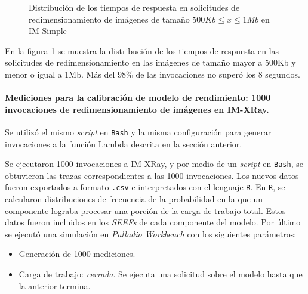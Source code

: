\begin{figure}
\hspace{-1.0cm}
\caption{Distribución de los tiempos de respuesta en solicitudes de redimensionamiento de imágenes de tamaño $500Kb \leq x \leq 1Mb$ en IM-Simple}
\label{fig:distribucion-solicitudes-imagenes-hasta-1mb}
\end{figure}


En la figura \ref{fig:distribucion-solicitudes-imagenes-hasta-1mb} se muestra la distribución de los tiempos de respuesta en las solicitudes de redimensionamiento en las imágenes de tamaño mayor a 500Kb y menor o igual a 1Mb. Más del 98\% de las invocaciones no superó los 8 segundos.

\paragraph{Mediciones para la calibración de modelo de rendimiento: 1000 invocaciones de redimensionamiento de imágenes en IM-XRay.} Se utilizó el mismo \emph{script} en \texttt{Bash} y la misma configuración para generar invocaciones a la función Lambda descrita en la sección anterior.

Se ejecutaron 1000 invocaciones a IM-XRay, y por medio de un \emph{script} en \texttt{Bash}, se obtuvieron las trazas correspondientes a las 1000 invocaciones. Los nuevos datos fueron exportados a formato \texttt{.csv} e interpretados con el lenguaje \texttt{R}. En \texttt{R}, se calcularon distribuciones de frecuencia de la probabilidad en la que un componente lograba procesar una porción de la carga de trabajo total. Estos datos fueron incluidos en los \emph{SEEFs} de cada componente del modelo. Por último se ejecutó una simulación en \emph{Palladio Workbench} con los siguientes parámetros:
\begin{itemize}
    \item Generación de 1000 mediciones.
    \item Carga de trabajo: \emph{cerrada}. Se ejecuta una solicitud sobre el modelo hasta que la anterior termina. 
\end{itemize}

